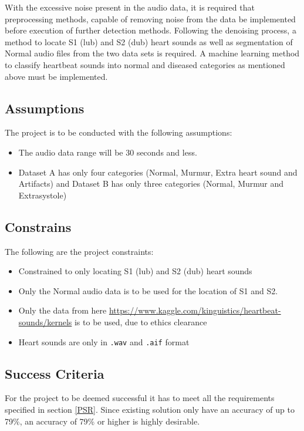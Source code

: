 \documentclass[10pt,twocolumn]{witseiepaper}
\begin{document}
With the excessive noise present in the audio data, it is required that preprocessing methods, capable of removing noise from the data be implemented before execution of further detection methods. Following the denoising process, a method to locate S1 (lub) and S2 (dub) heart sounds as well as segmentation of Normal audio files from the two data sets is required. A machine learning method to classify heartbeat sounds into normal and diseased categories as mentioned above must be implemented.

\subsection{Assumptions}
The project is to be conducted with the following assumptions:

\begin{itemize}
    \item The audio data range will be 30 seconds and less.
    \item Dataset A has only four categories (Normal, Murmur, Extra heart sound and Artifacts) and Dataset B has only three categories (Normal, Murmur and Extrasystole)
\end{itemize}

\subsection{Constrains}
The following are the project constraints:

\begin{itemize}
    \item Constrained to only locating S1 (lub) and S2 (dub) heart sounds
    \item Only the Normal audio data is to be used for the location of S1 and S2.
    \item Only the data from here {\url{https://www.kaggle.com/kinguistics/heartbeat-sounds/kernels}} is to be used, due to ethics clearance
    \item Heart sounds are only in \texttt{.wav} and \texttt{.aif} format
\end{itemize}
\subsection{Success Criteria}
For the project to be deemed successful it has to meet all the requirements specified in section \ref{PSR}. Since existing solution only have an accuracy of up to 79\%, an accuracy of 79\% or higher is highly desirable.
\end{document}

